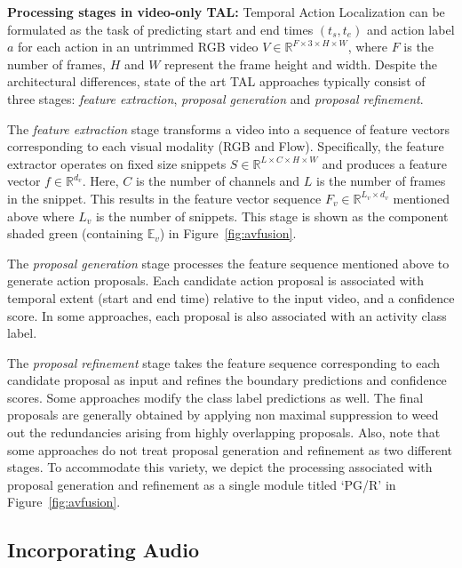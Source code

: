 \documentclass[10pt,twocolumn,letterpaper]{article}
\begin{document}
\noindent \textbf{Processing stages in video-only {TAL}:} Temporal Action Localization can be formulated as the task of predicting start and end times $(t_{s},t_{e})$ and action label $a$ for each action in an untrimmed RGB video $V \in \mathbb{R}^{F \times 3 \times H \times W}$, where $F$ is the number of frames, $H$ and $W$ represent the frame height and width. Despite the architectural differences, state of the art TAL approaches typically consist of three stages: \textit{feature extraction}, \textit{proposal generation} and \textit{proposal refinement}. 


The \textit{feature extraction} stage transforms a video into a sequence of feature vectors corresponding to each visual modality (RGB and Flow). Specifically, the feature extractor operates on fixed size snippets $S \in \mathbb{R} ^{L \times C \times H \times W}$ and produces a feature vector $f \in \mathbb{R}^{d_v}$. Here, $C$ is the number of channels and $L$ is the number of frames in the snippet. This results in the feature vector sequence $F_v \in \mathbb{R}^{L_{v} \times d_v}$ mentioned above where $L_v$ is the number of snippets. This stage is shown as the component shaded green (containing $\mathbb{E}_v$) in Figure~\ref{fig:avfusion}.


The \textit{proposal generation} stage processes the feature sequence mentioned above to generate action proposals. Each candidate action proposal is associated with temporal extent (start and end time) relative to the input video, and a confidence score. In some approaches, each proposal is also associated with an activity class label.


The \textit{proposal refinement} stage takes the feature sequence corresponding to each candidate proposal as input and refines the boundary predictions and confidence scores. Some approaches modify the class label predictions as well. The final proposals are generally obtained by applying non maximal suppression to weed out the redundancies arising from highly overlapping proposals. Also, note that some approaches do not treat proposal generation and refinement as two different stages. To accommodate this variety, we depict the processing associated with proposal generation and refinement as a single module titled `PG/R' in Figure~\ref{fig:avfusion}.



\subsection{Incorporating Audio}
\end{document}
